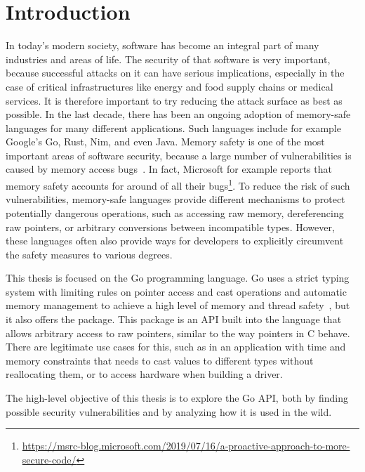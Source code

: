 
\chapter{Introduction}\label{ch:introduction}

In today's modern society, software has become an integral part of many industries and areas of life.
The security of that software is very important, because successful attacks on it can have serious implications,
especially in the case of critical infrastructures like energy and food supply chains or medical services.
It is therefore important to try reducing the attack surface as best as possible.
In the last decade, there has been an ongoing adoption of memory-safe languages for many different applications.
Such languages include for example Google's Go, Rust, Nim, and even Java.
Memory safety is one of the most important areas of software security, because a large number of vulnerabilities is
caused by memory access bugs~\cite{heffley2004}.
In fact, Microsoft for example reports that memory safety accounts for around  of all their
bugs\footnote{\scriptsize\url{https://msrc-blog.microsoft.com/2019/07/16/a-proactive-approach-to-more-secure-code/}}.
To reduce the risk of such vulnerabilities, memory-safe languages provide different mechanisms to protect potentially
dangerous operations, such as accessing raw memory, dereferencing raw pointers, or arbitrary conversions between
incompatible types.
However, these languages often also provide ways for developers to explicitly circumvent the safety measures to various
degrees.

This thesis is focused on the Go programming language.
Go uses a strict typing system with limiting rules on pointer access and cast operations and automatic memory management
to achieve a high level of memory and thread safety~\cite{sibiryov2017}, but it also offers the \unsafe{} package.
This package is an \acrshort{API} built into the language that allows arbitrary access to raw pointers, similar to the
way pointers in C behave.
There are legitimate use cases for this, such as in an application with time and memory constraints that needs to cast
values to different types without reallocating them, or to access hardware when building a driver.

\begin{hero}
    The high-level objective of this thesis is to explore the Go \unsafe{} \acrshort{API}, both by finding possible
    security vulnerabilities and by analyzing how it is used in the wild.
\end{hero}

